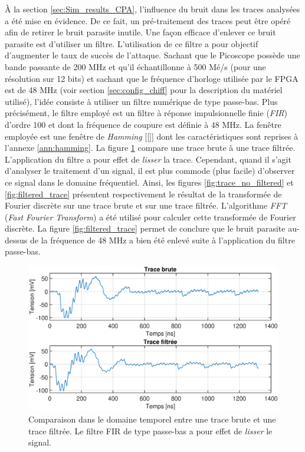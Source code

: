 \documentclass[oneside]{book}
\begin{document}
À la section \ref{sec:Sim_results_CPA}, l'influence du bruit dans les traces analysées a été mise en évidence. De ce fait, un pré-traitement des traces peut être opéré afin de retirer le bruit parasite inutile. Une façon efficace d'enlever ce bruit parasite est d'utiliser un filtre. L'utilisation de ce filtre a pour objectif d'augmenter le taux de succès de l'attaque. Sachant que le Picoscope possède une bande passante de 200 MHz et qu'il échantillonne à 500 Mé/s (pour une résolution sur 12 bits) et sachant que le fréquence d'horloge utilisée par le FPGA est de 48 MHz (voir section \ref{sec:config_chiff} pour la description du matériel utilisé), l'idée consiste à utiliser un filtre numérique de type passe-bas. Plus précisément, le filtre employé est un filtre à réponse impulsionnelle finie (\textit{FIR}) d'ordre 100 et dont la fréquence de coupure est définie à 48 MHz. La fenêtre employée est une fenêtre de \textit{Hamming} [\ref{}] dont les caractéristiques sont reprises à l'annexe \ref{ann:hamming}. La figure \ref{fig:traces_comparaison_bruit} compare une trace brute à une trace filtrée. L'application du filtre a pour effet de \textit{lisser} la trace. Cependant, quand il s'agit d'analyser le traitement d'un signal, il est plus commode (plus facile) d'observer ce signal dans le domaine fréquentiel. Ainsi, les figures \ref{fig:trace_no_filtered} et \ref{fig:filtered_trace} présentent respectivement le résultat de la transformée de Fourier discrète sur une trace brute et sur une trace filtrée. L'algorithme \textit{FFT} (\textit{Fast Fourier Transform}) a été utilisé pour calculer cette transformée de Fourier discrète. La figure \ref{fig:filtered_trace} permet de conclure que le bruit parasite au-dessus de la fréquence de 48 MHz a bien été enlevé suite à l'application du filtre passe-bas.

\begin{figure}[htbp]
    \hspace{-2cm}
    \includegraphics[scale=0.6]{image/traces_comparaison_bruit}
    \caption{Comparaison dans le domaine temporel entre une trace brute et une trace filtrée. Le filtre FIR de type passe-bas a pour effet de \textit{lisser} le signal.}
    \label{fig:traces_comparaison_bruit} 
\end{figure}
\end{document}
